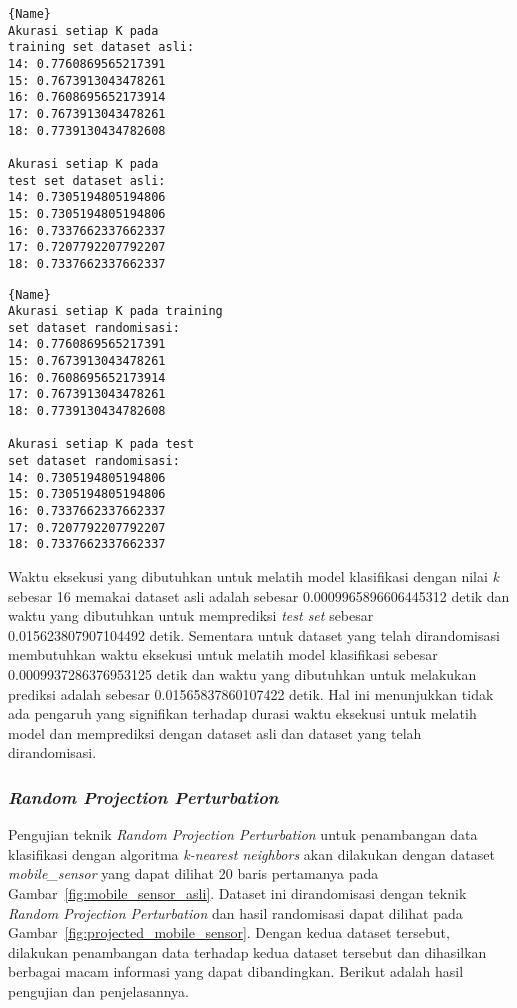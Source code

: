 \noindent\begin{minipage}{.46\textwidth}
	\begin{lstlisting}[caption=Akurasi Dataset Asli,frame=tlrb, label=diabetes_akurasi_asli]{Name}
Akurasi setiap K pada 
training set dataset asli:
14: 0.7760869565217391
15: 0.7673913043478261
16: 0.7608695652173914
17: 0.7673913043478261
18: 0.7739130434782608

Akurasi setiap K pada 
test set dataset asli: 
14: 0.7305194805194806
15: 0.7305194805194806
16: 0.7337662337662337
17: 0.7207792207792207
18: 0.7337662337662337
	\end{lstlisting}
\end{minipage}\hfill
\begin{minipage}{.46\textwidth}
	\begin{lstlisting}[caption=Akurasi Dataset Randomisasi,frame=tlrb, label=diabetes_akurasi_randomisasi]{Name}
Akurasi setiap K pada training 
set dataset randomisasi: 
14: 0.7760869565217391
15: 0.7673913043478261
16: 0.7608695652173914
17: 0.7673913043478261
18: 0.7739130434782608

Akurasi setiap K pada test 
set dataset randomisasi: 
14: 0.7305194805194806
15: 0.7305194805194806
16: 0.7337662337662337
17: 0.7207792207792207
18: 0.7337662337662337
	\end{lstlisting}
\end{minipage}
	
Waktu eksekusi yang dibutuhkan untuk melatih model klasifikasi dengan nilai \textit{k} sebesar 16 memakai dataset asli adalah sebesar 0.0009965896606445312 detik dan waktu yang dibutuhkan untuk memprediksi \textit{test set} sebesar 0.015623807907104492 detik. Sementara untuk dataset yang telah dirandomisasi membutuhkan waktu eksekusi untuk melatih model klasifikasi sebesar 0.0009937286376953125 detik dan waktu yang dibutuhkan untuk melakukan prediksi adalah sebesar 0.01565837860107422 detik. Hal ini menunjukkan tidak ada pengaruh yang signifikan terhadap durasi waktu eksekusi untuk melatih model dan memprediksi dengan dataset asli dan dataset yang telah dirandomisasi.

\subsubsection{\textit{Random Projection Perturbation}}
\label{subsubsec:pengujian-klasifikasi-rpp}

Pengujian teknik \textit{Random Projection Perturbation} untuk penambangan data klasifikasi dengan algoritma \textit{k-nearest neighbors} akan dilakukan dengan dataset \textit{mobile\_sensor} yang dapat dilihat 20 baris pertamanya pada Gambar~\ref{fig:mobile_sensor_asli}. Dataset ini dirandomisasi dengan teknik \textit{Random Projection Perturbation} dan hasil randomisasi dapat dilihat pada Gambar~\ref{fig:projected_mobile_sensor}. Dengan kedua dataset tersebut, dilakukan penambangan data terhadap kedua dataset tersebut dan dihasilkan berbagai macam informasi yang dapat dibandingkan. Berikut adalah hasil pengujian dan penjelasannya.

